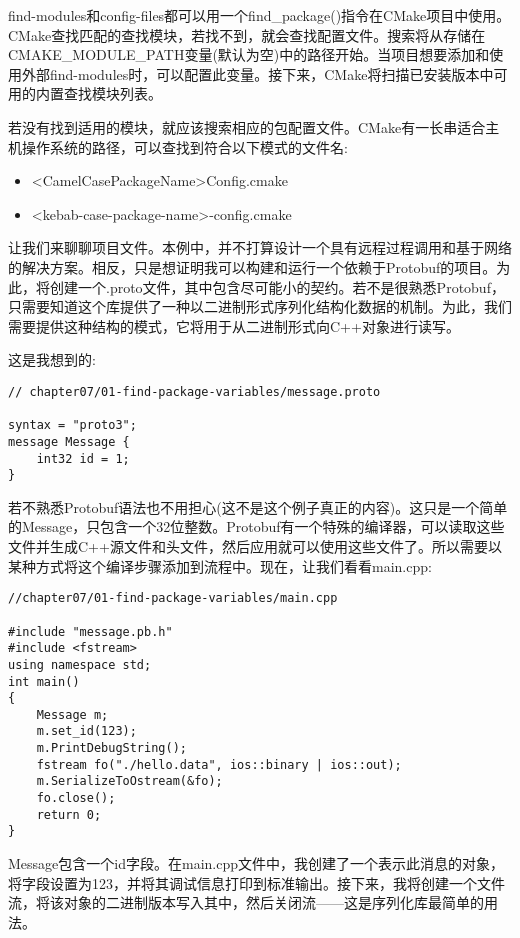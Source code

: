 find-modules和config-files都可以用一个find\_package()指令在CMake项目中使用。CMake查找匹配的查找模块，若找不到，就会查找配置文件。搜索将从存储在CMAKE\_MODULE\_PATH变量(默认为空)中的路径开始。当项目想要添加和使用外部find-modules时，可以配置此变量。接下来，CMake将扫描已安装版本中可用的内置查找模块列表。

若没有找到适用的模块，就应该搜索相应的包配置文件。CMake有一长串适合主机操作系统的路径，可以查找到符合以下模式的文件名:

\begin{itemize}
\item 
<CamelCasePackageName>Config.cmake

\item 
<kebab-case-package-name>-config.cmake
\end{itemize}

让我们来聊聊项目文件。本例中，并不打算设计一个具有远程过程调用和基于网络的解决方案。相反，只是想证明我可以构建和运行一个依赖于Protobuf的项目。为此，将创建一个.proto文件，其中包含尽可能小的契约。若不是很熟悉Protobuf，只需要知道这个库提供了一种以二进制形式序列化结构化数据的机制。为此，我们需要提供这种结构的模式，它将用于从二进制形式向C++对象进行读写。

这是我想到的:

\begin{lstlisting}[style=styleCXX]
// chapter07/01-find-package-variables/message.proto

syntax = "proto3";
message Message {
	int32 id = 1;
}
\end{lstlisting}

若不熟悉Protobuf语法也不用担心(这不是这个例子真正的内容)。这只是一个简单的Message，只包含一个32位整数。Protobuf有一个特殊的编译器，可以读取这些文件并生成C++源文件和头文件，然后应用就可以使用这些文件了。所以需要以某种方式将这个编译步骤添加到流程中。现在，让我们看看main.cpp:

\begin{lstlisting}[style=styleCXX]
//chapter07/01-find-package-variables/main.cpp

#include "message.pb.h"
#include <fstream>
using namespace std;
int main()
{
	Message m;
	m.set_id(123);
	m.PrintDebugString();
	fstream fo("./hello.data", ios::binary | ios::out);
	m.SerializeToOstream(&fo);
	fo.close();
	return 0;
}
\end{lstlisting}

Message包含一个id字段。在main.cpp文件中，我创建了一个表示此消息的对象，将字段设置为123，并将其调试信息打印到标准输出。接下来，我将创建一个文件流，将该对象的二进制版本写入其中，然后关闭流——这是序列化库最简单的用法。

